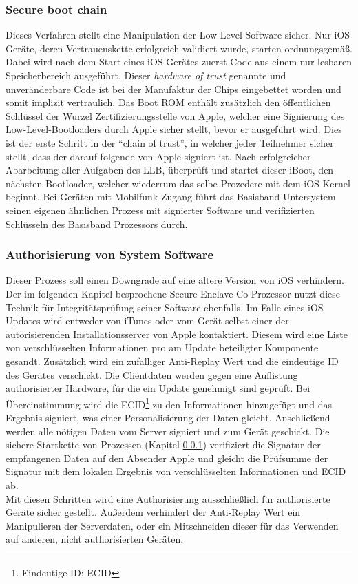 	\subsubsection{Secure boot chain}\label{sec:secure-boot-chain}
		Dieses Verfahren stellt eine Manipulation der Low-Level Software sicher. Nur
		iOS Geräte, deren Vertrauenskette erfolgreich validiert wurde, starten
		ordnungsgemäß. Dabei wird nach dem Start eines iOS Gerätes zuerst Code aus
		einem nur lesbaren Speicherbereich ausgeführt. Dieser \textit{hardware of
		trust} genannte und unveränderbare Code ist bei der Manufaktur der Chips
		eingebettet worden und somit implizit vertraulich. Das Boot ROM enthält
		zusätzlich den öffentlichen Schlüssel der Wurzel Zertifizierungsstelle von
		Apple, welcher eine Signierung des Low-Level-Bootloaders durch Apple sicher
		stellt, bevor er ausgeführt wird.
		Dies ist der erste Schritt in der "`chain of trust"', in welcher jeder
		Teilnehmer sicher stellt, dass der darauf folgende von Apple signiert ist. 		
		Nach erfolgreicher Abarbeitung aller Aufgaben des LLB, überprüft und startet
		dieser iBoot, den nächsten Bootloader, welcher wiederrum das selbe Prozedere
		mit dem iOS Kernel beginnt. Bei Geräten mit Mobilfunk Zugang führt das
		Basisband Untersystem seinen eigenen ähnlichen Prozess mit signierter 
		Software und verifizierten Schlüsseln des Basisband Prozessors durch.
		
	\subsubsection{Authorisierung von System Software}\label{sec:code-signing}
		Dieser Prozess soll einen Downgrade auf eine ältere Version von iOS
		verhindern. Der im folgenden Kapitel besprochene Secure Enclave Co-Prozessor
		nutzt diese Technik für Integritätsprüfung seiner Software ebenfalls. Im Falle
		eines iOS Updates wird entweder von iTunes oder vom Gerät selbst einer der
		autorisierenden Installationsserver von Apple kontaktiert. Diesem
		wird eine Liste von verschlüsselten Informationen pro am Update beteiligter
		Komponente gesandt. Zusätzlich wird ein zufälliger
		Anti-Replay Wert und die eindeutige ID des Gerätes
		verschickt. Die Clientdaten werden gegen eine Auflistung authorisierter Hardware, für die ein
		Update genehmigt sind geprüft. Bei Übereinstimmung wird die
		ECID\footnote{Eindeutige ID: ECID} zu den Informationen hinzugefügt und das
		Ergebnis signiert, was einer Personalisierung der Daten gleicht.
		Anschließend werden alle nötigen Daten vom Server signiert und zum Gerät
		geschickt. Die sichere Startkette von Prozessen (Kapitel
		\ref{sec:secure-boot-chain}) verifiziert die Signatur der empfangenen Daten
		auf den Absender Apple und gleicht die Prüfsumme der Signatur mit dem lokalen
		Ergebnis von verschlüsselten Informationen und ECID ab.\\
		Mit diesen Schritten wird eine Authorisierung ausschließlich für authorisierte
		Geräte sicher gestellt. Außerdem verhindert der Anti-Replay Wert ein
		Manipulieren der Serverdaten, oder ein Mitschneiden dieser für
		das Verwenden auf anderen, nicht authorisierten Geräten.
